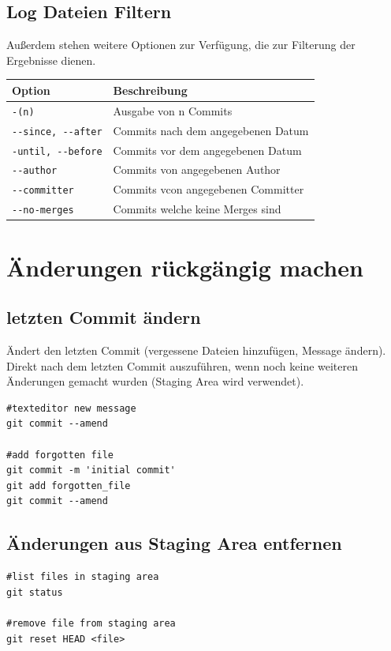\subsection{Log Dateien Filtern}
Außerdem stehen weitere Optionen zur Verfügung, die zur Filterung der Ergebnisse dienen.
\begin{center}
\renewcommand{\arraystretch}{1.2}
\begin{tabular}{|p{4cm}p{10cm}|}
\hline
\textbf{Option}				&\textbf{Beschreibung}\\
\hline
\texttt{-(n)}					&Ausgabe von n Commits\\
\hline
\texttt{-{}-since, -{}-after}		&Commits nach dem angegebenen Datum\\
\hline
\texttt{-{}until, -{}-before}		&Commits vor dem angegebenen Datum\\
\hline
\texttt{-{}-author}			&Commits von angegebenen Author\\
\hline
\texttt{-{}-committer}			&Commits vcon angegebenen Committer\\
\hline
\texttt{-{}-no-merges}			&Commits welche keine Merges sind\\
\hline
\end{tabular}
\renewcommand{\arraystretch}{1}
\end{center}
\section{Änderungen rückgängig machen}
\subsection{letzten Commit ändern}
Ändert den letzten Commit (vergessene Dateien hinzufügen, Message ändern). Direkt nach dem letzten Commit auszuführen, wenn noch keine weiteren Änderungen gemacht wurden (Staging Area wird verwendet).\\
\begin{lstlisting}[caption={letzten Commit ändern},captionpos=b]
#texteditor new message
git commit --amend

#add forgotten file
git commit -m 'initial commit'
git add forgotten_file
git commit --amend
\end{lstlisting}
\subsection{Änderungen aus Staging Area entfernen}
\begin{lstlisting}[caption={Entfernen aus Staging Area},captionpos=b]
#list files in staging area
git status

#remove file from staging area
git reset HEAD <file>
\end{lstlisting}
